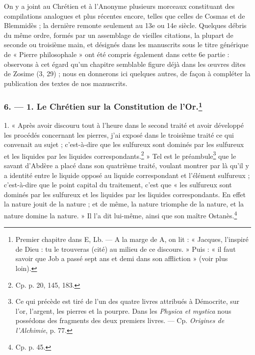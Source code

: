 \documentclass[a4paper, 11pt, oneside, polutonikogreek, french]{article}
\begin{document}
On y a joint au Chrétien et à l'Anonyme plusieurs morceaux constituant des compilations analogues et plus récentes encore, telles que celles de Cosmas et de Blemmidès ; la dernière remonte seulement au 13e ou 14e siècle. Quelques débris du même ordre, formés par un assemblage de vieilles citations, la plupart de seconde ou troisième main, et désignés dans les manuscrits sous le titre générique de « Pierre philosophale » ont été compris également dans cette 6e partie : observons à cet égard qu'un chapitre semblable figure déjà dans les œuvres dites de Zosime (3, 29) ; nous en donnerons ici quelques autres, de façon à compléter la publication des textes de nos manuscrits.

\bigskip
\centerline{\EightStarTaper}
\centerline{\EightStarTaper\EightStarTaper}
\bigskip

\subsubsection[6. --- 1. Le Chrétien sur la Constitution de l'Or.]{6. --- 1. Le Chrétien sur la Constitution de l'Or.\footnote{Premier chapitre dans E, Lb. --- A la marge de A, on lit : « Jacques, l'inspiré de Dieu : tu le trouveras (cité) au milieu de ce discours. » Puis : « il faut savoir que Job a passé sept ans et demi dans son affliction » (voir plus loin).}}

1. « Après avoir discouru tout à l'heure dans le second traité et avoir développé les procédés concernant les pierres, j'ai exposé dans le troisième traité ce qui convenait au sujet ; c'est-à-dire que les sulfureux sont dominés par les sulfureux et les liquides par les liquides correspondants.\footnote{Cp. p. 20, 145, 183.} » Tel est le préambule\footnote{Ce qui précède est tiré de l'un des quatre livres attribués à Démocrite, sur l'or, l'argent, les pierres et la pourpre. Dans les \emph{Physica et mystica} nous possédons des fragments des deux premiers livres. --- Cp. \emph{Origines de l'Alchimie}, p. 77.} que le savant d'Abdère a placé dans son quatrième traité, voulant montrer par là qu'il y a identité entre le liquide opposé au liquide correspondant et l'élément sulfureux ; c'est-à-dire que le point capital du traitement, c'est que « les sulfureux sont dominés par les sulfureux et les liquides par les liquides correspondants. En effet la nature jouit de la nature ; et de même, la nature triomphe de la nature, et la nature domine la nature. » Il l'a dit lui-même, ainsi que son maître Ostanès.\footnote{Cp. p. 45.}
\end{document}

